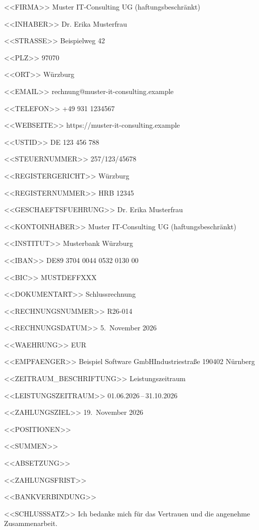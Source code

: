 <<FIRMA>>
Muster IT-Consulting UG (haftungsbeschränkt)

<<INHABER>>
Dr. Erika Musterfrau

<<STRASSE>>
Beispielweg 42

<<PLZ>>
97070

<<ORT>>
Würzburg

<<EMAIL>>
rechnung@muster-it-consulting.example

<<TELEFON>>
+49 931 1234567

<<WEBSEITE>>
https://muster-it-consulting.example

<<USTID>>
DE 123 456 788

<<STEUERNUMMER>>
257/123/45678

<<REGISTERGERICHT>>
Würzburg

<<REGISTERNUMMER>>
HRB 12345

<<GESCHAEFTSFUEHRUNG>>
Dr. Erika Musterfrau

<<KONTOINHABER>>
Muster IT-Consulting UG (haftungsbeschränkt)

<<INSTITUT>>
Musterbank Würzburg

<<IBAN>>
DE89 3704 0044 0532 0130 00

<<BIC>>
MUSTDEFFXXX

<<DOKUMENTART>>
Schlussrechnung

<<RECHNUNGSNUMMER>>
R26-014

<<RECHNUNGSDATUM>>
5.~November 2026

<<WAEHRUNG>>
EUR

<<EMPFAENGER>>
Beispiel Software GmbH\zeilenwechsel{}Industriestraße 1\zeilenwechsel{}90402 Nürnberg

<<ZEITRAUM_BESCHRIFTUNG>>
Leistungszeitraum

<<LEISTUNGSZEITRAUM>>
01.06.2026\,–\,31.10.2026

<<ZAHLUNGSZIEL>>
19.~November 2026

<<POSITIONEN>>

<<SUMMEN>>
   \summentrenner{}

<<ABSETZUNG>>

<<ZAHLUNGSFRIST>>

<<BANKVERBINDUNG>>
\bankblock{}

<<SCHLUSSSATZ>>
Ich bedanke mich für das Vertrauen und die angenehme Zusammenarbeit.
